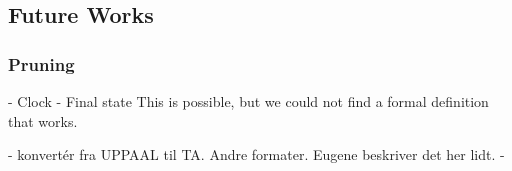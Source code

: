 \subsection{Future Works}\label{subsec:futureWorks}


\subsubsection{Pruning}\label{futureWorks:pruning}
- Clock
- Final state
This is possible, but we could not find a formal definition that works.
\cite{Daws1996}



- konvertér fra UPPAAL til TA. Andre formater. Eugene beskriver det her lidt.
- 